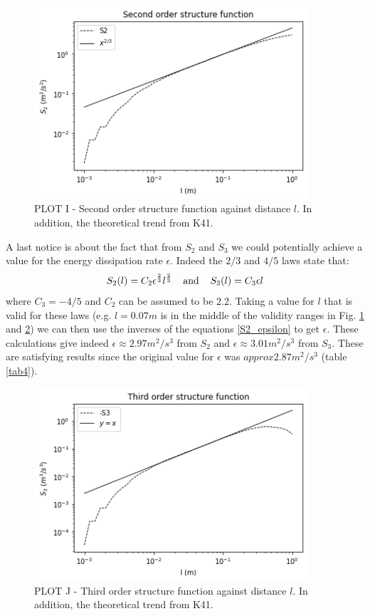 \documentclass[11pt,titlepage]{article}
\begin{document}
\begin{center}
	\begin{figure} [h]
		\centering
		\includegraphics[width = 4in]{./figures/ex1_7_1.png}
		\caption{PLOT I - Second order structure function against distance $l$. In addition, the theoretical trend from K41.}
		\label{fig12}
	\end{figure}
\end{center}
A last notice is about the fact that from $S_2$ and $S_3$ we could potentially achieve a value for the energy dissipation rate $\epsilon$. Indeed the $2/3$ and $4/5$ laws state that:
\begin{equation} \label{S2_epsilon}
	S_2(l) = C_2 \epsilon^\frac{2}{3} l^\frac{2}{3} \hspace{4mm} \text{and} \hspace{4mm}S_3(l) = C_3 \epsilon l
\end{equation}
where $C_3 = -4/5$ and $C_2$ can be assumed to be $2.2$. Taking a value for $l$ that is valid for these laws (e.g. $l=0.07m$ is in the middle of the validity ranges in Fig. \ref{fig12} and \ref{fig13}) we can then use the inverses of the equations \ref{S2_epsilon} to get $\epsilon$. These calculations give indeed $\epsilon \approx 2.97 m^2/s^3$ from $S_2$ and $\epsilon \approx 3.01 m^2/s^3$ from $S_3$. These are satisfying results since the original value for $\epsilon$ was $approx 2.87 m^2/s^3$ (table \ref{tab4}).
\begin{center}
	\begin{figure} [h]
		\centering
		\includegraphics[width = 4in]{./figures/ex1_7_2.png}
		\caption{PLOT J - Third order structure function against distance $l$. In addition, the theoretical trend from K41.}
		\label{fig13}
	\end{figure}
\end{center}
\end{document}
